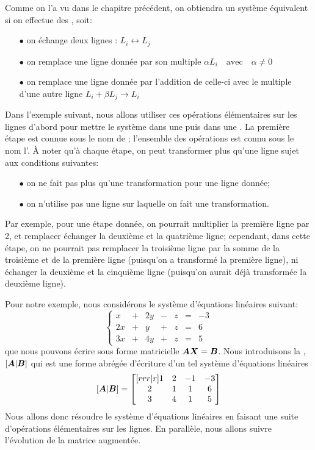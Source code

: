 Comme on l'a vu dans le chapitre précédent, on obtiendra un système équivalent si on
effectue des , soit:
\begin{itemize}
	\item[$\bullet$] on échange deux lignes :  $ L_i \leftrightarrow L_j$
	\item[$\bullet$] on remplace une ligne donnée par son multiple
	$ \alpha L_i  \quad \mbox{avec} \quad\alpha \ne 0$
	\item[$\bullet$] on remplace une ligne donnée par l'addition de celle-ci avec le multiple d'une autre ligne
	$L_i + \beta L_j \rightarrow L_i$
\end{itemize}
Dans l'exemple suivant, nous allons utiliser ces opérations élémentaires sur les lignes d'abord pour
mettre le système dans une  puis dans une .
La première étape est connue sous le nom de ; l'ensemble
des opérations est connu sous le nom l'.
À noter qu'à chaque étape, on peut transformer plus qu'une ligne sujet aux conditions suivantes:
\begin{itemize}
	\item[$\bullet$] on ne fait pas plus qu'une transformation pour une ligne donnée;
	\item[$\bullet$] on n'utilise pas une ligne sur laquelle on fait une transformation.
\end{itemize}
Par exemple, pour une étape donnée, on pourrait multiplier la première ligne par 2, et remplacer échanger la deuxième
et la quatrième ligne; cependant, dans cette étape, on ne pourrait pas remplacer la troisième ligne
par la somme de la troisième et de la première ligne (puisqu'on a transformé la première ligne), ni
échanger la deuxième et la cinquième ligne (puisqu'on aurait déjà transformée la deuxième ligne).

Pour notre exemple, nous considérons le système d'équations linéaires suivant:
	\begin{equation}
	\label{system1}
	\left\{
	\begin{matrix}
	x &+& 2y &-& z &=& -3\\
	2x &+& y &+& z &=& 6\\
	3x &+& 4y &+& z &=& 5
	\end{matrix}\right.
	\end{equation}
que nous pouvons écrire sous forme matricielle $\boldsymbol{A}\boldsymbol{X}=\boldsymbol{B}$. 
Nous introduisons la , $[\boldsymbol{A}|\boldsymbol{B}]$ qui 
est une forme abrégée d'écriture d'un tel système d'équations linéaires
\[
[\boldsymbol{A}|\boldsymbol{B}] = \begin{bmatrix}[rrr|r]
1 & 2 & -1 & -3 \\
2 & 1 & 1 & 6 \\
3 & 4 & 1 & 5
\end{bmatrix}
\]
Nous allons donc résoudre le système d'équations linéaires en faisant une
suite d'opérations élémentaires sur les lignes.  En parallèle, nous allons
suivre l'évolution de la matrice augmentée.


